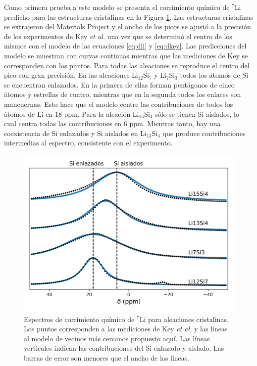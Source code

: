 Como primera prueba a este modelo se presenta el corrimiento químico de $^7$Li 
predicho para las estructuras cristalinas en la Figura \ref{fig:c-nmr}. 
Las estructuras cristalinas se extrajeron del Materials Project 
\cite{materials_project} y el ancho de los picos se ajustó a la precisión de los 
experimentos de Key \textit{et al.} \cite{key2009} una vez que se determinó el 
centro de los mismos con el modelo de las ecuaciones \ref{eq:dli} y \ref{eq:dkey}.
Las predicciones del modelo se muestran con curvas continuas mientras que las 
mediciones de Key se corresponden con los puntos. Para todas las aleaciones se 
reproduce el centro del pico con gran precisión. En las aleaciones 
Li$_{12}$Si$_7$ y Li$_7$Si$_3$ todos los átomos de Si se encuentran enlazados. 
En la primera de ellas forman pentágonos de cinco átomos y estrellas de cuatro, 
mientras que en la segunda todos los enlaces son mancuernas. Esto hace que el 
modelo centre las contribuciones de todos los átomos de Li en 18 ppm. Para 
la aleación Li$_{15}$Si$_4$ sólo se tienen Si aislados, lo cual centra todas las
contribuciones en 6 ppm. Mientras tanto, hay una coexistencia de Si enlazados y 
Si aislados en Li$_{13}$Si$_4$ que produce contribuciones intermedias al espectro,
consistente con el experimento.
\begin{figure}[h!]
    \centering
    \includegraphics[width=.7\textwidth]{Silicio/prediccion/resultados/nmr/c-nmr.png}
    \caption{Espectros de corrimiento químico de $^7$Li para aleaciones 
    cristalinas. Los puntos corresponden a las mediciones de Key \textit{et al.} \cite{key2009}
    y las líneas al modelo de vecinos más cercanos propuesto aquí. Las líneas verticales indican las 
    contribuciones del Si enlazado y aislado. Las barras de error son menores que
    el ancho de las líneas.}
    \label{fig:c-nmr}
\end{figure}

